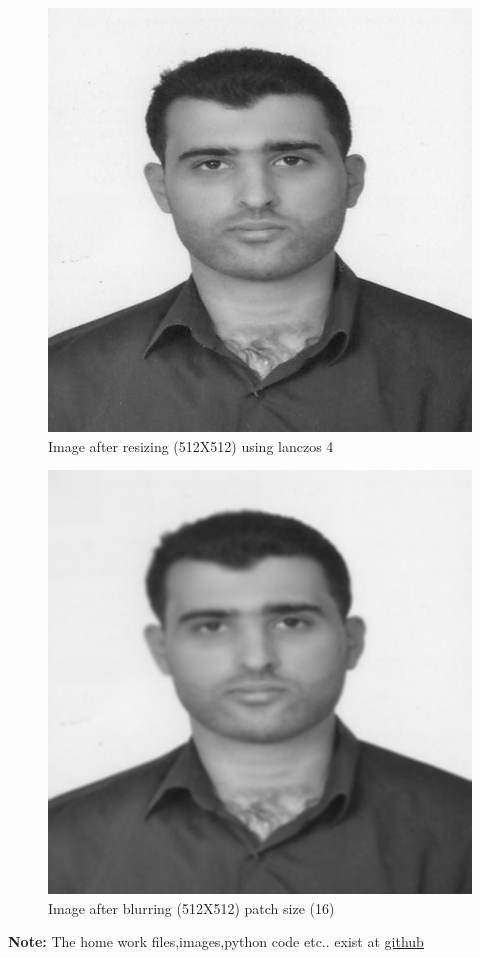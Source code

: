 \documentclass{article}
\begin{document}
\begin{figure}[H]
\includegraphics[scale=1]{mypicture_resized.jpg}
\caption{Image after resizing (512X512) using lanczos 4}
\end{figure}
\begin{figure}[H]
\includegraphics[scale=1]{blurred_piece_by_piece.jpg}
\caption{Image after blurring (512X512) patch size (16)}
\end{figure}
\textbf{Note: }The home work files,images,python code etc.. exist at \href{https://github.com/aqeel13932/IP/tree/master/hw4}{github}
\end{document}
